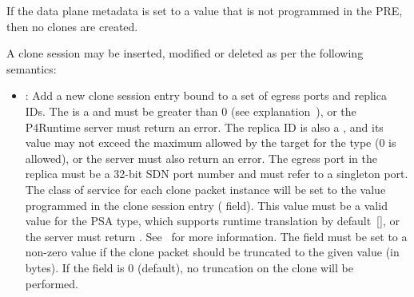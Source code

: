 \documentclass[11pt]{article}
\begin{document}
{%
If the  data plane metadata is set to a value that is not
programmed in the PRE, then no clones are created.%

A clone session may be inserted, modified or deleted as per the following
semantics:%

\begin{itemize}[noitemsep,topsep=\mdcompacttopsep]%

\item{}: Add a new clone session entry bound to a set of egress ports and
replica IDs. The  is a  and must be greater than 0 (see
explanation~), or the P4Runtime
server must return an  error. The replica  ID is
also a , and its value may not exceed the maximum allowed by the
target for the  type (0 is allowed), or the server must also
return an  error. The egress port in the replica must be a
32-bit SDN port number and must refer to a singleton port. The class of
service for each clone packet instance will be set to the value programmed in
the clone session entry ( field). This value must be a valid
value for the PSA  type, which supports runtime translation
by default~[], or the server must return
. See~ for more information. The
 field must be set to a non-zero value if the clone
packet should be truncated to the given value (in bytes). If the
 field is 0 (default), no truncation on the clone will be
performed.%


\end{itemize}}
\end{document}
